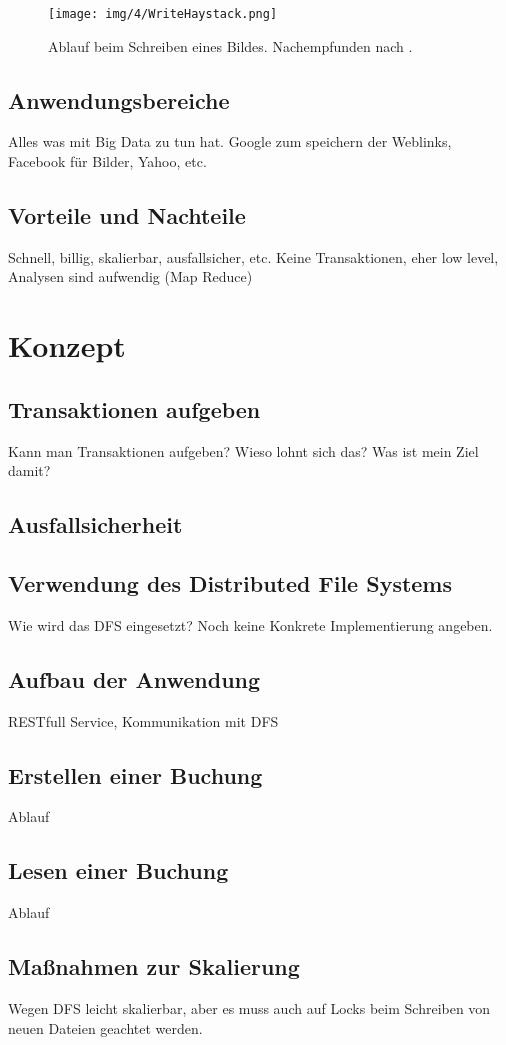 \documentclass[12pt,oneside,a4paper,parskip]{scrbook}
\begin{document}
\begin{figure}[h]
  \centering
  \texttt{[image: img/4/WriteHaystack.png]}
  \caption[Ablauf beim Schreiben eines Bildes in Haystack.]{ Ablauf beim Schreiben eines Bildes. Nachempfunden nach \cite{haystack}.}
  \label{writeHaystack}
\end{figure}

\section{Anwendungsbereiche}
Alles was mit Big Data zu tun hat. Google zum speichern der Weblinks, Facebook für Bilder, Yahoo, etc.
\section{Vorteile und Nachteile}
Schnell, billig, skalierbar, ausfallsicher, etc.
Keine Transaktionen, eher low level, Analysen sind aufwendig (Map Reduce)

\chapter{Konzept}
\section{Transaktionen aufgeben}
Kann man Transaktionen aufgeben? Wieso lohnt sich das? Was ist mein Ziel damit?
\section{Ausfallsicherheit}
\section{Verwendung des Distributed File Systems}
Wie wird das DFS eingesetzt? Noch keine Konkrete Implementierung angeben.
\section{Aufbau der Anwendung}
RESTfull Service, Kommunikation mit DFS
\section{Erstellen einer Buchung}
Ablauf
\section{Lesen einer Buchung}
Ablauf
\section{Maßnahmen zur Skalierung}
Wegen DFS leicht skalierbar, aber es muss auch auf Locks beim Schreiben von neuen Dateien geachtet werden.
\end{document}
